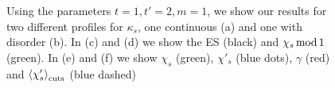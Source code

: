 \documentclass[twocolumn,amsmath,longbibliography,amssymb,superscriptaddress]{revtex4-1}
\begin{document}
\begin{figure}[h!]


\centering
{}\hspace{0mm}

\hspace{0mm}


\caption{Using the parameters \label{inh}$t=1,t'=2,m =1$, we show our results for two different profiles for $\kappa_s$, one continuous (a) and one with disorder (b). In (c) and (d) we show the ES (black) and $ \chi_s \, {\rm mod} \, 1$ (green). In (e) and (f) we show $\chi_s$ (green), $\chi'_s$ (blue dots), $\gamma$ (red) and $\expval{\chi'_s}_{\rm cuts}$ (blue dashed) }

\end{figure}
\end{document}
